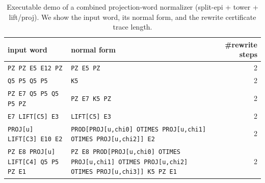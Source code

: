 \begin{table}[H]
\centering
\scriptsize
\setlength{\tabcolsep}{6pt}
\caption{Executable demo of a combined projection-word normalizer (split-epi + tower + lift/proj). We show the input word, its normal form, and the rewrite certificate trace length.}
\label{tab:pom_projword_full_normalizer_demo}
\begin{tabular}{l l r}
\toprule
input word & normal form & \#rewrite steps\\
\midrule
\texttt{PZ PZ E5 E12 PZ} & \texttt{PZ E5 PZ} & 2\\
\texttt{Q5 P5 Q5 P5} & \texttt{K5} & 2\\
\texttt{PZ E7 Q5 P5 Q5 P5 PZ} & \texttt{PZ E7 K5 PZ} & 2\\
\texttt{E7 LIFT[C5] E3} & \texttt{LIFT[C5] E3} & 2\\
\texttt{PROJ[u] LIFT[C3] E10 E2} & \texttt{PROD[PROJ[u,chi0] OTIMES PROJ[u,chi1] OTIMES PROJ[u,chi2]] E2} & 2\\
\texttt{PZ E8 PROJ[u] LIFT[C4] Q5 P5 PZ E1} & \texttt{PZ E8 PROD[PROJ[u,chi0] OTIMES PROJ[u,chi1] OTIMES PROJ[u,chi2] OTIMES PROJ[u,chi3]] K5 PZ E1} & 2\\
\bottomrule
\end{tabular}
\end{table}

